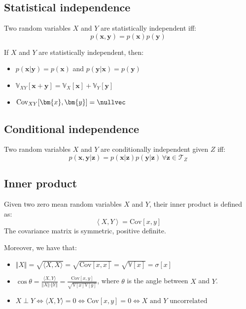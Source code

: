 \subsection{Statistical independence}
Two random variables $X$ and $Y$ are statistically independent iff:
\[ p(\bm{x}, \bm{y}) = p(\bm{x})p(\bm{y}) \]

\begin{theorem}
    If $X$ and $Y$ are statistically independent, then:
    \begin{itemize}
        \item $p(\bm{x} \vert \bm{y}) = p(\bm{x})$ and $p(\bm{y} \vert \bm{x}) = p(\bm{y})$
        \item $\mathbb{V}_{XY}[\bm{x} + \bm{y}] = \mathbb{V}_X[\bm{x}] + \mathbb{V}_Y[\bm{y}]$
        \item $\text{Cov}_{XY}[\bm{x}, \bm{y}] = \nullvec$
    \end{itemize}
\end{theorem}


\subsection{Conditional independence}
Two random variables $X$ and $Y$ are conditionally independent given $Z$ iff:
\[ p(\bm{x}, \bm{y} \vert \bm{z}) = p(\bm{x} \vert \bm{z}) p(\bm{y} \vert \bm{z}) \, \forall \bm{z} \in \mathcal{T}_Z \]


\subsection{Inner product}
Given two zero mean random variables $X$ and $Y$, their inner product is defined as:
\[ \left\langle X, Y \right\rangle = \text{Cov}[x, y] \]
The covariance matrix is symmetric, positive definite.

Moreover, we have that:
\begin{itemize}
    \item $\Vert X \Vert = \sqrt{\langle X, X \rangle} = \sqrt{\text{Cov}[x, x]} = \sqrt{\mathbb{V}[x]} = \sigma[x]$
    \item 
        $\cos\theta = \frac{\langle X, Y \rangle}{\Vert X \Vert \cdot \Vert Y \Vert} = 
        \frac{\text{Cov}[x, y]}{\sqrt{\mathbb{V}[x]\mathbb{V}[y]}}$, where $\theta$ is the angle between $X$ and $Y$.
    \item $X \perp Y \iff \langle X, Y \rangle = 0 \iff \text{Cov}[x, y] = 0 \iff X \text{ and } Y \text{ uncorrelated}$
\end{itemize}



